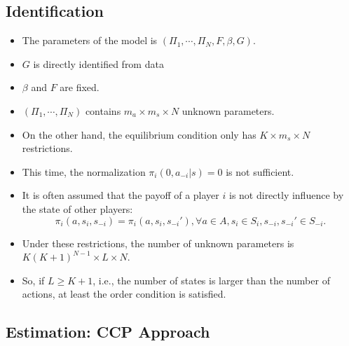 \documentclass[
]{book}
\providecommand{\tightlist}{%
  \setlength{\itemsep}{0pt}\setlength{\parskip}{0pt}}
\begin{document}
\hypertarget{identification-1}{%
\subsection{Identification}\label{identification-1}}

\begin{itemize}
\tightlist
\item
  The parameters of the model is \((\Pi_1, \cdots, \Pi_N, F, \beta, G)\).
\item
  \(G\) is directly identified from data
\item
  \(\beta\) and \(F\) are fixed.
\item
  \((\Pi_1, \cdots, \Pi_N)\) contains \(m_a \times m_s \times N\) unknown parameters.
\item
  On the other hand, the equilibrium condition only has \(K \times m_s \times N\) restrictions.
\item
  This time, the normalization \(\pi_i(0, a_{-i}|s) = 0\) is not sufficient.
\item
  It is often assumed that the payoff of a player \(i\) is not directly influence by the state of other players:
  \begin{equation}
  \pi_i(a, s_i, s_{-i}) = \pi_i(a, s_i, s_{-i}'), \forall a \in A, s_i \in S_i, s_{-i}, s_{-i}' \in S_{-i}.
  \end{equation}
\item
  Under these restrictions, the number of unknown parameters is \(K (K + 1)^{N - 1} \times L \times N\).
\item
  So, if \(L \ge K + 1\), i.e., the number of states is larger than the number of actions, at least the order condition is satisfied.
\end{itemize}

\hypertarget{estimation-ccp-approach}{%
\subsection{Estimation: CCP Approach}\label{estimation-ccp-approach}}
\end{document}
